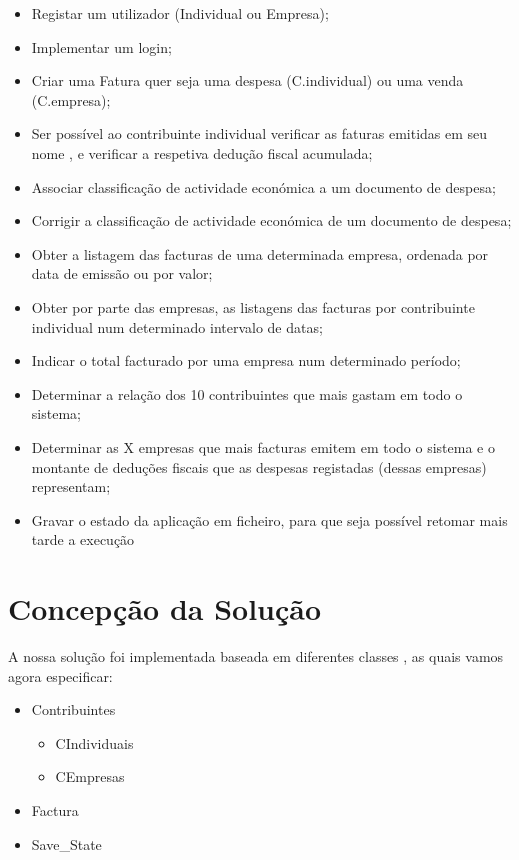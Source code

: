 \documentclass[a4paper]{article}
\begin{document}
\begin{itemize}
\item Registar um utilizador (Individual ou Empresa);
\item Implementar um login;
\item Criar uma Fatura quer seja uma despesa (C.individual) ou uma venda (C.empresa);
\item Ser possível ao contribuinte individual verificar as faturas emitidas em seu nome , e verificar a respetiva dedução fiscal acumulada;
\item Associar classificação de actividade económica a um documento de despesa;
\item Corrigir a classificação de actividade económica de um documento de despesa;
\item Obter a listagem das facturas de uma determinada empresa, ordenada por data de emissão
ou por valor;
\item Obter por parte das empresas, as listagens das facturas por contribuinte individual num determinado
intervalo de datas;
\item Indicar o total facturado por uma empresa num determinado período;
\item Determinar a relação dos 10 contribuintes que mais gastam em todo o sistema;
\item Determinar as X empresas que mais facturas emitem em todo o sistema e o montante de
deduções fiscais que as despesas registadas (dessas empresas) representam;
\item Gravar o estado da aplicação em ficheiro, para que seja possível retomar mais tarde a execução

\end{itemize}

\section{Concepção da Solução}
\label{sec:solucao}
A nossa solução foi implementada baseada em diferentes classes , as quais vamos agora especificar:

\begin{itemize}
	\item{Contribuintes}
		\begin{itemize}
			\item{CIndividuais}
			\item{CEmpresas}
		\end{itemize}
	\item{Factura}
	\item{Save_State}
\end{itemize}
\end{document}
